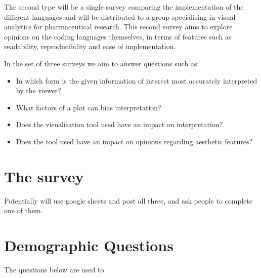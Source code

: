 The second type will be a single survey comparing the implementation of the different languages and will be distributed to a group specialising 
in visual analytics for pharmaceutical research. This second survey aims to explore opinions on the coding languages themselves, in terms of 
features such as readability, reproducibility and ease of implementation.



In the set of three surveys we aim to answer questions such as: 

\begin{itemize}
    \item In which form is the given information of interest most accurately interpreted by the viewer?
    \item What factors of a plot can bias interpretation? 
    \item Does the visualisation tool used have an impact on interpretation?
    \item Does the tool used have an impact on opinions regarding aesthetic features?
\end{itemize}



\section{The survey}

Potentially will use google sheets and post all three, and ask people to complete one of them.

\section{\textbf{Demographic Questions}}

The questions below are used to 

